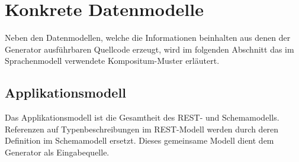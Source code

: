 \section{Konkrete Datenmodelle}
\label{sec:concrete_models}

Neben den Datenmodellen, welche die Informationen beinhalten aus denen der Generator ausführbaren Quellcode erzeugt, wird im folgenden Abschnitt das im Sprachenmodell verwendete Kompositum-Muster erläutert.





\subsection{Applikationsmodell}
\label{sec:application_model}

Das Applikationsmodell ist die Gesamtheit des \gls{REST}- und Schemamodells. Referenzen auf Typenbeschreibungen im \gls{REST}-Modell werden durch deren Definition im Schemamodell ersetzt. Dieses gemeinsame Modell dient dem Generator als Eingabequelle.

